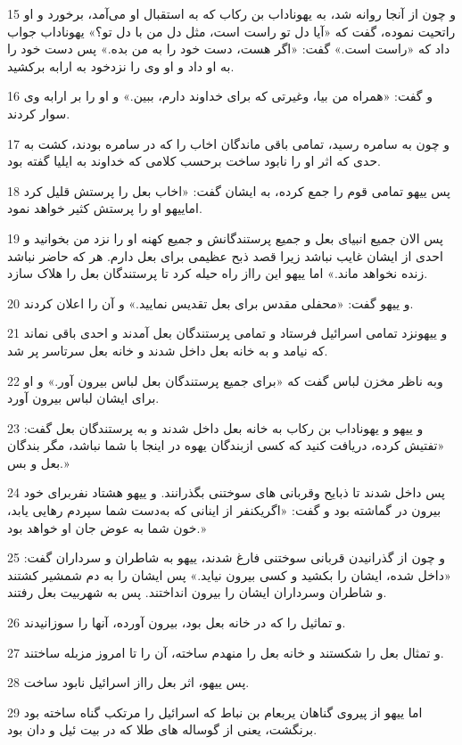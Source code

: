 \par 15 و چون از آنجا روانه شد، به یهوناداب بن رکاب که به استقبال او می‌آمد، برخورد و او راتحیت نموده، گفت که «آیا دل تو راست است، مثل دل من با دل تو؟» یهوناداب جواب داد که «راست است.» گفت: «اگر هست، دست خود را به من بده.» پس دست خود را به او داد و او وی را نزدخود به ارابه برکشید.
\par 16 و گفت: «همراه من بیا، وغیرتی که برای خداوند دارم، ببین.» و او را بر ارابه وی سوار کردند.
\par 17 و چون به سامره رسید، تمامی باقی ماندگان اخاب را که در سامره بودند، کشت به حدی که اثر او را نابود ساخت بر‌حسب کلامی که خداوند به ایلیا گفته بود.
\par 18 پس ییهو تمامی قوم را جمع کرده، به ایشان گفت: «اخاب بعل را پرستش قلیل کرد اماییهو او را پرستش کثیر خواهد نمود.
\par 19 پس الان جمیع انبیای بعل و جمیع پرستندگانش و جمیع کهنه او را نزد من بخوانید و احدی از ایشان غایب نباشد زیرا قصد ذبح عظیمی برای بعل دارم. هر که حاضر نباشد زنده نخواهد ماند.» اما ییهو این رااز راه حیله کرد تا پرستندگان بعل را هلاک سازد.
\par 20 و ییهو گفت: «محفلی مقدس برای بعل تقدیس نمایید.» و آن را اعلان کردند.
\par 21 و ییهونزد تمامی اسرائیل فرستاد و تمامی پرستندگان بعل آمدند و احدی باقی نماند که نیامد و به خانه بعل داخل شدند و خانه بعل سرتاسر پر شد. 
\par 22 وبه ناظر مخزن لباس گفت که «برای جمیع پرستندگان بعل لباس بیرون آور.» و او برای ایشان لباس بیرون آورد.
\par 23 و ییهو و یهوناداب بن رکاب به خانه بعل داخل شدند و به پرستندگان بعل گفت: «تفتیش کرده، دریافت کنید که کسی ازبندگان یهوه در اینجا با شما نباشد، مگر بندگان بعل و بس.»
\par 24 پس داخل شدند تا ذبایح وقربانی های سوختنی بگذرانند. و ییهو هشتاد نفربرای خود بیرون در گماشته بود و گفت: «اگریکنفر از اینانی که به‌دست شما سپردم رهایی یابد، خون شما به عوض جان او خواهد بود.»
\par 25 و چون از گذرانیدن قربانی سوختنی فارغ شدند، ییهو به شاطران و سرداران گفت: «داخل شده، ایشان را بکشید و کسی بیرون نیاید.» پس ایشان را به دم شمشیر کشتند و شاطران وسرداران ایشان را بیرون انداختند. پس به شهربیت بعل رفتند.
\par 26 و تماثیل را که در خانه بعل بود، بیرون آورده، آنها را سوزانیدند.
\par 27 و تمثال بعل را شکستند و خانه بعل را منهدم ساخته، آن را تا امروز مزبله ساختند.
\par 28 پس ییهو، اثر بعل رااز اسرائیل نابود ساخت.
\par 29 اما ییهو از پیروی گناهان یربعام بن نباط که اسرائیل را مرتکب گناه ساخته بود برنگشت، یعنی از گوساله های طلا که در بیت ئیل و دان بود.
